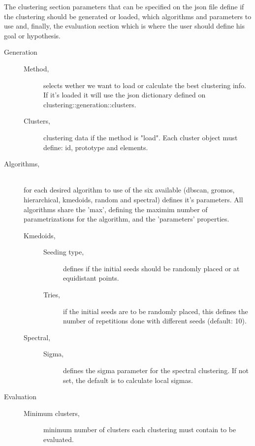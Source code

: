 The clustering section parameters that can be specified on the json file define if the clustering should be generated or loaded, which algorithms and parameters to use and, finally, the evaluation section which is where the user should define his goal or hypothesis.

\begin{description}
\item [Generation] \hfil
\begin{description}
\item [Method,] selects wether we want to load or calculate the best clustering info. If it's loaded it will use the json dictionary defined on clustering::generation::clusters.
\item [Clusters,] clustering data if the method is "load". Each cluster object must define: id, prototype and elements.
\end{description}
\item [Algorithms,] \hfil \\for each desired algorithm to use of the six available (dbscan, gromos, hierarchical, kmedoids, random and spectral) defines it's parameters. All algorithms share the 'max', defining the maximim number of parametrizations for the algorithm, and the 'parameters' properties.
\begin{description}
\item [Kmedoids, ] \hfil 
\begin{description}
\item [Seeding type,] defines if the initial seeds should be randomly placed or at equidistant points.
\item [Tries,] if the initial seeds are to be randomly placed, this defines the number of repetitions done with different seeds (default: 10).
\end{description} 
\end{description}
\begin{description}
\item [Spectral, ] \hfil 
\begin{description}
\item [Sigma,] defines the sigma parameter for the spectral clustering. If not set, the default is to calculate local sigmas.
\end{description} 
\end{description}
\item [Evaluation] \hfil
\begin{description}
\item [Minimum clusters,] minimum number of clusters each clustering must contain to be evaluated.

\end{description}
\end{description}
